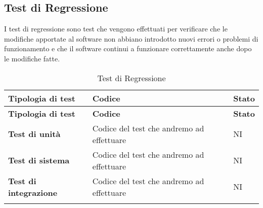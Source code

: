 \subsection{Test di Regressione}
I test di regressione sono test che vengono effettuati per verificare che le modifiche apportate al software non abbiano introdotto nuovi errori o problemi di funzionamento e che il software continui a funzionare correttamente anche dopo le modifiche fatte. \\
\begin{longtable}{|>{\raggedright\arraybackslash}m{}|>{\raggedright\arraybackslash}m{}|>{\raggedright\arraybackslash}m{}|}
	\hline
	\textbf{Tipologia di test} & \textbf{Codice} & \textbf{Stato} \\
	\hline
	\endfirsthead
	\hline
	\textbf{Tipologia di test} & \textbf{Codice} & \textbf{Stato} \\
	\endhead
	\textbf{Test di unità}   		& Codice del test che andremo ad effettuare     & NI\\
	\hline
	\textbf{Test di sistema}  		& Codice del test che andremo ad effettuare     & NI\\
	\hline
	\textbf{Test di integrazione}   & Codice del test che andremo ad effettuare     & NI\\
	\hline
	\caption{Test di Regressione} %
	\label{table:15}
\end{longtable}
\newpage
